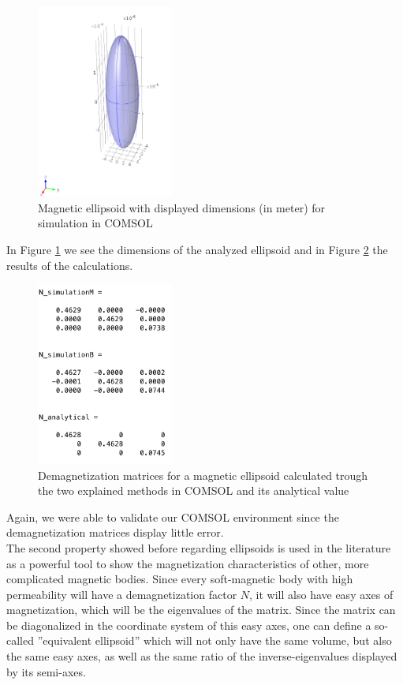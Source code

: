 \begin{figure}[ht]
	\centering
  \includegraphics[width=0.4\textwidth]{Pictures/ellipsoid.png}
	\caption{Magnetic ellipsoid with displayed dimensions (in meter) for simulation in COMSOL}
	\label{fig:ellipsoid}
\end{figure}

In Figure \ref{fig:ellipsoid} we see the dimensions of the analyzed ellipsoid and in Figure \ref{fig:N_ellipsoid} the results of the calculations.\\

\begin{figure}[ht]
	\centering
  \includegraphics[width=0.4\textwidth]{Pictures/N_ellipsoid.png}
	\caption{Demagnetization matrices for a magnetic ellipsoid calculated trough the two explained methods in COMSOL and its analytical value}
	\label{fig:N_ellipsoid}
\end{figure}

Again, we were able to validate our COMSOL environment since the demagnetization matrices display little error.\\

The second property showed before regarding ellipsoids is used in the literature as a powerful tool to show the magnetization characteristics of other, more complicated magnetic bodies. Since every soft-magnetic body with high permeability will have a demagnetization factor $N$, it will also have easy axes of magnetization, which will be the eigenvalues of the matrix. Since the matrix can be diagonalized in the coordinate system of this easy axes, one can define a so-called ''equivalent ellipsoid'' which will not only have the same volume, but also the same easy axes, as well as the same ratio of the inverse-eigenvalues displayed by its semi-axes.\\

